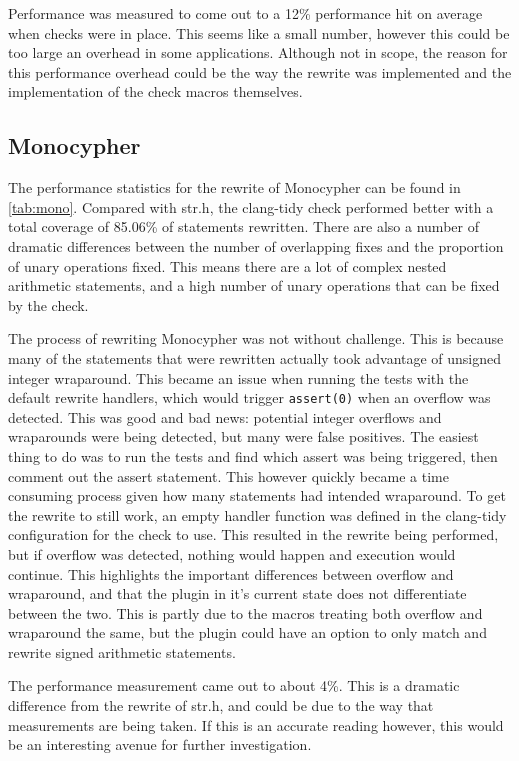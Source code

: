 Performance was measured to come out to a 12\% performance hit on average when checks were in place. This seems like a small number, however this could be too large an overhead in some applications. Although not in scope, the reason for this performance overhead could be the way the rewrite was implemented and the implementation of the check macros themselves.

\subsection{Monocypher}

The performance statistics for the rewrite of Monocypher can be found in \ref{tab:mono}. Compared with str.h, the clang-tidy check performed better with a total coverage of 85.06\% of statements rewritten. There are also a number of dramatic differences between the number of overlapping fixes and the proportion of unary operations fixed. This means there are a lot of complex nested arithmetic statements, and a high number of unary operations that can be fixed by the check.

The process of rewriting Monocypher was not without challenge. This is because many of the statements that were rewritten actually took advantage of unsigned integer wraparound. This became an issue when running the tests with the default rewrite handlers, which would trigger \texttt{assert(0)} when an overflow was detected. This was good and bad news: potential integer overflows and wraparounds were being detected, but many were false positives. The easiest thing to do was to run the tests and find which assert was being triggered, then comment out the assert statement. This however quickly became a time consuming process given how many statements had intended wraparound. To get the rewrite to still work, an empty handler function was defined in the clang-tidy configuration for the check to use. This resulted in the rewrite being performed, but if overflow was detected, nothing would happen and execution would continue. This highlights the important differences between overflow and wraparound, and that the plugin in it's current state does not differentiate between the two. This is partly due to the macros treating both overflow and wraparound the same, but the plugin could have an option to only match and rewrite signed arithmetic statements.

The performance measurement came out to about 4\%. This is a dramatic difference from the rewrite of str.h, and could be due to the way that measurements are being taken. If this is an accurate reading however, this would be an interesting avenue for further investigation.

